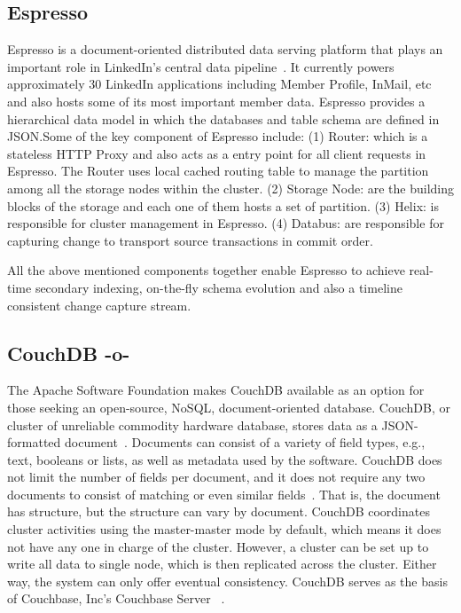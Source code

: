 \subsection{Espresso}

Espresso is a document-oriented distributed data serving platform that
plays an important role in LinkedIn's central data
pipeline~\cite{www-Linkedin-Espresso}.  It currently powers
approximately 30 LinkedIn applications including Member Profile,
InMail, etc and also hosts some of its most important member
data. Espresso provides a hierarchical data model in which the
databases and table schema are defined in JSON.Some of the key
component of Espresso include: (1) Router: which is a stateless HTTP
Proxy and also acts as a entry point for all client requests in
Espresso. The Router uses local cached routing table to manage the
partition among all the storage nodes within the cluster. (2) Storage
Node: are the building blocks of the storage and each one of them
hosts a set of partition. (3) Helix: is responsible for cluster
management in Espresso. (4) Databus: are responsible for capturing
change to transport source transactions in commit order.

     All the above mentioned components together enable Espresso to achieve 
     real-time secondary indexing, on-the-fly schema evolution and also a 
     timeline consistent change capture stream.

     \pv

\subsection{CouchDB -o-}
     
The Apache Software Foundation makes CouchDB available as an option
for those seeking an open-source, NoSQL, document-oriented
database. CouchDB, or cluster of unreliable commodity hardware
database, stores data as a JSON-formatted
document~\cite{www-exploringcdb-couchdb}.  Documents can consist of a
variety of field types, e.g., text, booleans or lists, as well as
metadata used by the software. CouchDB does not limit the number of
fields per document, and it does not require any two documents to
consist of matching or even similar
fields~\cite{www-techoverview-couchdb}. That is, the document has
structure, but the structure can vary by document.  CouchDB
coordinates cluster activities using the master-master mode by
default, which means it does not have any one in charge of the
cluster.  However, a cluster can be set up to write all data to single
node, which is then replicated across the cluster.  Either way, the
system can only offer eventual consistency. CouchDB serves as the
basis of Couchbase, Inc's Couchbase Server
~\cite{www-cdb-vs-cbs-couchdb}.

